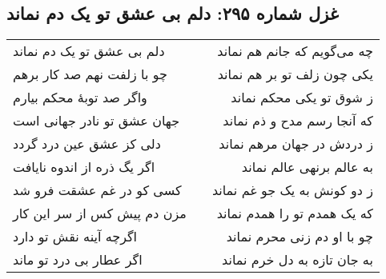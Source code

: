 \begin{center}
\section*{غزل شماره ۲۹۵: دلم بی عشق تو یک دم نماند}
\label{sec:295}
\begin{longtable}{l p{0.5cm} r}
دلم بی عشق تو یک دم نماند
&&
چه می‌گویم که جانم هم نماند
\\
چو با زلفت نهم صد کار برهم
&&
یکی چون زلف تو بر هم نماند
\\
واگر صد توبهٔ محکم بیارم
&&
ز شوق تو یکی محکم نماند
\\
جهان عشق تو نادر جهانی است
&&
که آنجا رسم مدح و ذم نماند
\\
دلی کز عشق عین درد گردد
&&
ز دردش در جهان مرهم نماند
\\
اگر یگ ذره از اندوه نایافت
&&
به عالم برنهی عالم نماند
\\
کسی کو در غم عشقت فرو شد
&&
ز دو کونش به یک جو غم نماند
\\
مزن دم پیش کس از سر این کار
&&
که یک همدم تو را همدم نماند
\\
اگرچه آینه نقش تو دارد
&&
چو با او دم زنی محرم نماند
\\
اگر عطار بی درد تو ماند
&&
به جان تازه به دل خرم نماند
\\
\end{longtable}
\end{center}
